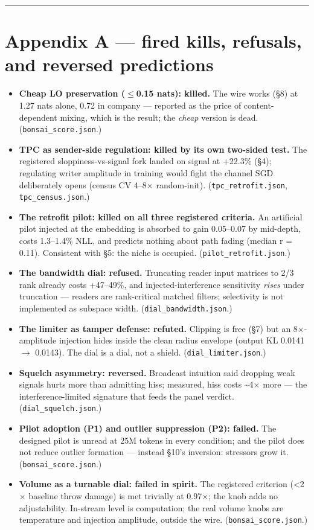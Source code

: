 \documentclass[10pt]{article}
\begin{document}
\bigskip\hrule\bigskip

\section{Appendix A --- fired kills, refusals, and reversed predictions}

\begin{itemize}\setlength\itemsep{1pt}
\item \textbf{Cheap LO preservation ($\le$0.15 nats): killed.} The wire works (§8) at 1.27 nats alone, 0.72 in company --- reported as the price of content-dependent mixing, which is the result; the \emph{cheap} version is dead. (\texttt{bonsai\_score.json}.)
\item \textbf{TPC as sender-side regulation: killed by its own two-sided test.} The registered sloppiness-vs-signal fork landed on signal at +22.3\% (§4); regulating writer amplitude in training would fight the channel SGD deliberately opens (census CV 4--8$\times$ random-init). (\texttt{tpc\_retrofit.json}, \texttt{tpc\_census.json}.)
\item \textbf{The retrofit pilot: killed on all three registered criteria.} An artificial pilot injected at the embedding is absorbed to gain 0.05--0.07 by mid-depth, costs 1.3--1.4\% NLL, and predicts nothing about path fading (median r = 0.11). Consistent with §5: the niche is occupied. (\texttt{pilot\_retrofit.json}.)
\item \textbf{The bandwidth dial: refused.} Truncating reader input matrices to 2/3 rank already costs +47--49\%, and injected-interference sensitivity \emph{rises} under truncation --- readers are rank-critical matched filters; selectivity is not implemented as subspace width. (\texttt{dial\_bandwidth.json}.)
\item \textbf{The limiter as tamper defense: refuted.} Clipping is free (§7) but an 8$\times$-amplitude injection hides inside the clean radius envelope (output KL 0.0141 $\to$ 0.0143). The dial is a dial, not a shield. (\texttt{dial\_limiter.json}.)
\item \textbf{Squelch asymmetry: reversed.} Broadcast intuition said dropping weak signals hurts more than admitting hiss; measured, hiss costs \textasciitilde{}4$\times$ more --- the interference-limited signature that feeds the panel verdict. (\texttt{dial\_squelch.json}.)
\item \textbf{Pilot adoption (P1) and outlier suppression (P2): failed.} The designed pilot is unread at 25M tokens in every condition; and the pilot does not reduce outlier formation --- instead §10's inversion: stressors grow it. (\texttt{bonsai\_score.json}.)
\item \textbf{Volume as a turnable dial: failed in spirit.} The registered criterion (<2$\times$ baseline throw damage) is met trivially at 0.97$\times$; the knob adds no adjustability. In-stream level is computation; the real volume knobs are temperature and injection amplitude, outside the wire. (\texttt{bonsai\_score.json}.)
\end{itemize}
\end{document}

